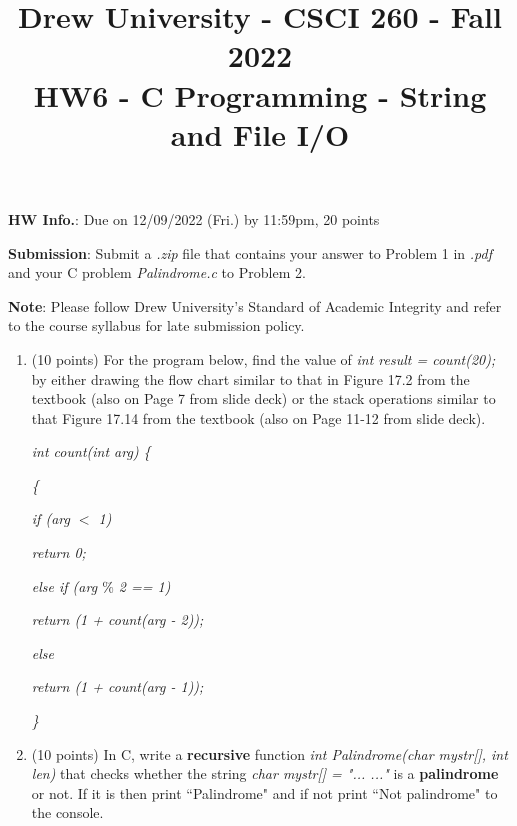 \documentclass{article}
\title{\textbf{Drew University - CSCI 260 - Fall 2022\\HW6 - C Programming - String and File I/O}}
\date{}
\begin{document}
\maketitle

\vspace{-0.5in}
\textbf{HW Info.}: Due on 12/09/2022 (Fri.) by 11:59pm, 20 points

\textbf{Submission}: Submit a \textit{.zip} file that contains your answer to Problem 1 in \textit{.pdf} and your C problem \textit{Palindrome.c} to Problem 2.

\textbf{Note}: Please follow Drew University's Standard of Academic Integrity and refer to the course syllabus for late submission policy.\\



\begin{enumerate}
    \item (10 points) For the program below, find the value of \textit{int result = count(20);} by either drawing the flow chart similar to that in Figure 17.2 from the textbook (also on Page 7 from slide deck) or the stack operations similar to that Figure 17.14 from the textbook (also on Page 11-12 from slide deck).
    
    \hspace{0.5in}\textit{int count(int arg) \{}
    
    \hspace{0.5in}\textit{\{}
    
    \hspace{0.65in}\textit{if (arg $<$ 1)}
    
    \hspace{0.8in}\textit{return 0;}
    
    \hspace{0.65in}\textit{else if (arg $\%$ 2 == 1)}
    
    \hspace{0.8in}\textit{return (1 + count(arg - 2));}

    \hspace{0.65in}\textit{else}
    
    \hspace{0.8in}\textit{return (1 + count(arg - 1));}
    
    \hspace{0.5in}\textit{\}}
    
    
    \vspace{0.3in}
    \item (10 points) In C, write a \textbf{recursive} function \textit{int Palindrome(char mystr[], int len)} that checks whether the string \textit{char mystr[] = "... ..."} is a \textbf{palindrome} or not. If it is then print ``Palindrome" and if not print ``Not palindrome" to the console.
    

\end{enumerate}
\end{document}
